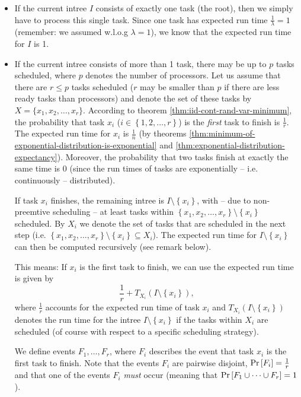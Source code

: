 \begin{itemize}
\item If the current intree $I$ consists of exactly one task (the root), then we simply have to process this single task. Since one task has expected run time $\frac{1}{\lambda}=1$ (remember: we assumed w.l.o.g $\lambda=1$), we know that the expected run time for $I$ is 1.
\item If the current intree consists of more than 1 task, there may be up to $p$ tasks scheduled, where $p$ denotes the number of processors. Let us assume that there are $r\leq p$ tasks scheduled ($r$ may be smaller than $p$ if there are less ready tasks than processors) and denote the set of these tasks by $X=\{x_1,x_2,\dots,x_r\}$. According to theorem \ref{thm:iid-cont-rand-var-minimum}, the probability that task $x_i$ ($i\in\left\{ 1,2,\dots,r \right\}$) is the \emph{first} task to finish is $\frac{1}{r}$. The expected run time for $x_i$ is $\frac{1}{n}$ (by theorems \ref{thm:minimum-of-exponential-distribution-is-exponential} and \ref{thm:exponential-distribution-expectancy}). Moreover, the probability that two tasks finish at exactly the same time is 0 (since the run times of tasks are exponentially -- i.e. continuously -- distributed).

  If task $x_i$ finishes, the remaining intree is $I\setminus\left\{ x_i \right\}$, with -- due to non-preemtive scheduling -- at least tasks within $\left\{ x_1,x_2,\dots,x_r \right\} \setminus \left\{ x_i \right\}$ scheduled. By $X_i$ we denote the set of tasks that are scheduled in the next step (i.e. $\left\{ x_1,x_2,\dots,x_r \right\} \setminus \left\{ x_i \right\} \subseteq X_i$). The expected run time for $I\setminus\left\{ x_i \right\}$ can then be computed recursively (see remark below).

  This means: If $x_i$ is the first task to finish, we can use the expected run time is given by
  \begin{equation*}
    \frac{1}{r} + T_{X_i}(I\setminus\left\{ x_i \right\}),
  \end{equation*}
  where $\frac{1}{r}$ accounts for the expected run time of task $x_i$ and $T_{X_i}(I\setminus\left\{ x_i \right\})$ denotes the run time for the intree $I\setminus\left\{ x_i \right\}$ if the tasks within $X_i$ are scheduled (of course with respect to a specific scheduling strategy).

  We define events $F_1,\dots,F_r$, where $F_i$ describes the event that task $x_i$ is the first task to finish. Note that the events $F_i$ are pairwise disjoint, $\operatorname{Pr}\left[F_i\right]=\frac{1}{r}$ and that one of the events $F_i$ \emph{must} occur (meaning that $\operatorname{Pr}\left[F_1\cup \dots \cup F_r\right]=1$).
  

\end{itemize}
